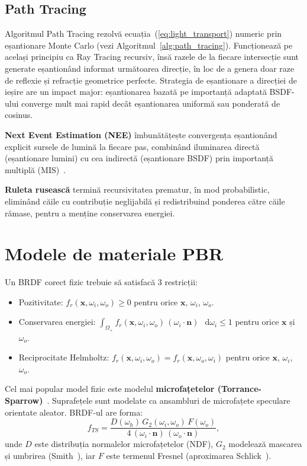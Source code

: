 \documentclass[12pt,a4paper]{report}
\newcommand*\diff{\mathop{}\!\mathrm{d}}
\numberwithin{equation}{section} %
\begin{document}
\subsection{Path Tracing}\label{sec:path_tracing}

Algoritmul Path Tracing rezolvă ecuația~(\ref{eq:light_transport}) numeric prin eșantionare Monte Carlo (vezi Algoritmul~\ref{alg:path_tracing}).
Funcționează pe același principiu ca Ray Tracing recursiv, însă razele de la fiecare intersecție sunt generate eșantionând informat următoarea direcție, în loc de a genera doar raze de reflexie și refracție geometrice perfecte.
Strategia de eșantionare a direcției de ieșire are un impact major: eșantionarea bazată pe importanță adaptată BSDF-ului converge mult mai rapid decât eșantionarea uniformă sau ponderată de cosinus.

\textbf{Next Event Estimation (NEE)} îmbunătățește convergența eșantionând explicit sursele de lumină la fiecare pas, combinând iluminarea directă (eșantionare lumini) cu cea indirectă (eșantionare BSDF) prin importanță multiplă (MIS)~\cite{Veach,VeachPower}.

\textbf{Ruleta rusească} termină recursivitatea prematur, în mod probabilistic, eliminând căile cu contribuție neglijabilă și redistribuind ponderea către căile rămase, pentru a menține conservarea energiei.

\section{Modele de materiale PBR}\label{sec:pbr}

Un BRDF corect fizic trebuie să satisfacă 3 restricții:
\begin{itemize}
	\item Pozitivitate: $f_r(\mathbf{x}, \omega_i, \omega_o) \geq 0$ pentru orice $\mathbf{x}$, $\omega_i$, $\omega_o$.
	\item Conservarea energiei: $\int_{\Omega_+} f_r(\mathbf{x}, \omega_i, \omega_o)\,(\omega_i \cdot \mathbf{n})\,\diff\omega_i \leq 1$ pentru orice $\mathbf{x}$ și $\omega_o$.
	\item Reciprocitate Helmholtz: $f_r(\mathbf{x}, \omega_i, \omega_o) = f_r(\mathbf{x}, \omega_o, \omega_i)$ pentru orice $\mathbf{x}$, $\omega_i$, $\omega_o$.
\end{itemize}

Cel mai popular model fizic este modelul \textbf{microfațetelor (Torrance-Sparrow)}~\cite{TorranceOld,CookTorrance}.
Suprafețele sunt modelate ca ansambluri de microfațete speculare orientate aleator.
BRDF-ul are forma:
\begin{equation}
    f_{TS} = \frac{D(\omega_h)\,G_2(\omega_i,\omega_o)\,F(\omega_o)}
             {4\,(\omega_i\cdot\mathbf{n})\,(\omega_o\cdot\mathbf{n})},
\end{equation}
unde $D$ este distribuția normalelor microfațetelor (NDF), $G_2$ modelează mascarea și umbrirea (Smith~\cite{SmithG1,WalterSmithG2}), iar $F$ este termenul Fresnel (aproximarea Schlick~\cite{Schlick}).
\end{document}
